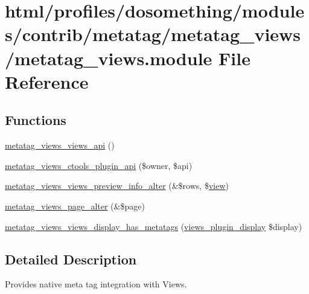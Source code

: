 \hypertarget{metatag__views_8module}{
\section{html/profiles/dosomething/modules/contrib/metatag/metatag\_\-views/metatag\_\-views.module File Reference}
\label{metatag__views_8module}
}
\subsection*{Functions}
\begin{DoxyCompactItemize}
\item 
\hyperlink{metatag__views_8module_a14e6770336b652a72feda62886fb8b89}{metatag\_\-views\_\-views\_\-api} ()
\item 
\hyperlink{metatag__views_8module_acdb5321ba336ff6b2b7c7b0d4481cfe8}{metatag\_\-views\_\-ctools\_\-plugin\_\-api} (\$owner, \$api)
\item 
\hyperlink{metatag__views_8module_a562122ccf416b8a9ea62e89474d6f030}{metatag\_\-views\_\-views\_\-preview\_\-info\_\-alter} (\&\$rows, \$\hyperlink{classview}{view})
\item 
\hyperlink{metatag__views_8module_a8b28fa077c01e52a415eb829b0b8526c}{metatag\_\-views\_\-page\_\-alter} (\&\$page)
\item 
\hyperlink{metatag__views_8module_aaff22581f126c9d9c3dc9a7fc13a5c62}{metatag\_\-views\_\-views\_\-display\_\-has\_\-metatags} (\hyperlink{classviews__plugin__display}{views\_\-plugin\_\-display} \$display)
\end{DoxyCompactItemize}


\subsection{Detailed Description}
Provides native meta tag integration with Views. 

